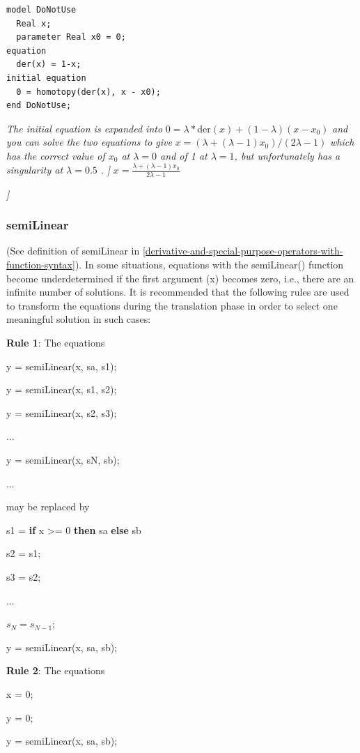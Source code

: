 \documentclass[10pt,a4paper]{report}
\def\doublelabel#1{\label{#1}\hypertarget{#1}{}}
\begin{document}
\begin{lstlisting}[language=modelica]
model DoNotUse
  Real x;
  parameter Real x0 = 0;
equation
  der(x) = 1-x;
initial equation
  0 = homotopy(der(x), x - x0);
end DoNotUse;
\end{lstlisting}

\emph{The initial equation is expanded into}
$ 0 = \lambda*\mathrm{der}(x)+(1-\lambda)(x-x_0)$
\emph{and you can solve the two equations to give}
$ x=(\lambda+(\lambda-1)x_0)/(2\lambda-1)$
\emph{which has the correct value of $x_0$ at $\lambda = 0$ and of 1 at $\lambda= 1$, but unfortunately has a singularity at $\lambda = 0.5 $ .}
\emph{{]}}
$ x=\frac{\lambda+(\lambda-1)x_0}{2\lambda-1}$

\emph{{]}}

\subsubsection{semiLinear}\doublelabel{semilinear}

(See definition of semiLinear in \ref{derivative-and-special-purpose-operators-with-function-syntax}). In some situations,
equations with the semiLinear() function become underdetermined if the
first argument (x) becomes zero, i.e., there are an infinite number of
solutions. It is recommended that the following rules are used to
transform the equations during the translation phase in order to select
one meaningful solution in such cases:

\textbf{Rule 1}: The equations

y = semiLinear(x, sa, s1);

y = semiLinear(x, s1, s2);

y = semiLinear(x, s2, s3);

...

y = semiLinear(x, sN, sb);

...

may be replaced by

s1 = \textbf{if} x \textgreater{}= 0 \textbf{then} sa \textbf{else} sb

s2 = s1;

s3 = s2;

...

$s_N = s_{N-1}$;

y = semiLinear(x, sa, sb);

\textbf{Rule 2}: The equations

x = 0;

y = 0;

y = semiLinear(x, sa, sb);
\end{document}
